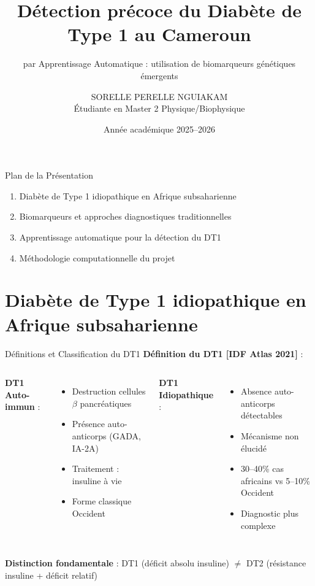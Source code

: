 \documentclass[11pt, aspectratio=169]{beamer}
\title{Détection précoce du Diabète de Type 1 au Cameroun}
\subtitle{par Apprentissage Automatique : utilisation de biomarqueurs génétiques émergents}
\author{SORELLE PERELLE NGUIAKAM \\ Étudiante en Master 2 Physique/Biophysique}
\institute{Université de Yaoundé I \\ Département de Physique}
\date{Année académique 2025--2026}
\begin{document}
\frame{\titlepage}

\begin{frame}{Plan de la Présentation}
  \begin{enumerate}
    \item Diabète de Type 1 idiopathique en Afrique subsaharienne
    \item Biomarqueurs et approches diagnostiques traditionnelles
    \item Apprentissage automatique pour la détection du DT1
    \item Méthodologie computationnelle du projet
  \end{enumerate}
\end{frame}

\section{Diabète de Type 1 idiopathique en Afrique subsaharienne}

\begin{frame}{Définitions et Classification du DT1}
  \textbf{Définition du DT1 [IDF Atlas 2021]} :
  
  \vspace{0.6em}
  
  \begin{columns}[T]
    \textbf{\color{accent2} DT1 Auto-immun} :
    \begin{itemize}
      \item Destruction cellules $\beta$ pancréatiques
      \item Présence auto-anticorps (GADA, IA-2A)
      \item Traitement : insuline à vie
      \item Forme classique Occident
    \end{itemize}
    
    \textbf{\color{accent1} DT1 Idiopathique} :
    \begin{itemize}
      \item Absence auto-anticorps détectables
      \item Mécanisme non élucidé
      \item 30--40\% cas africains vs 5--10\% Occident
      \item Diagnostic plus complexe
    \end{itemize}
  \end{columns}
  
  \vspace{1em}
  
  \textbf{Distinction fondamentale} : DT1 (déficit absolu insuline) $\neq$ DT2 (résistance insuline + déficit relatif)
\end{frame}
\end{document}
